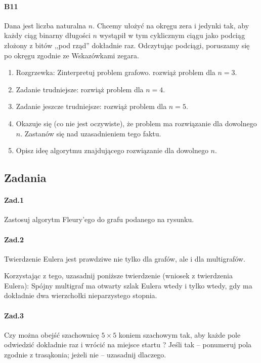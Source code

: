 \documentclass[a4paper,12pt]{article}
\theoremstyle{definition}%
\theoremstyle{definition}
\theoremstyle{problem}
\begin{document}
\paragraph{B11} Dana jest liczba naturalna $n$. Chcemy ułożyć na okręgu zera i jedynki tak, aby każdy ciąg binarny
długości $n$ wystąpił w tym cyklicznym ciągu jako podciąg złożony z bitów ,,pod rząd” dokładnie raz. Odczytując podciągi, poruszamy się po okręgu zgodnie ze Wskazówkami zegara.
\begin{enumerate}[label=\alph*)]
\item Rozgrzewka: Zinterpretuj problem grafowo. rozwiąż problem dla $n = 3$.
\item Zadanie trudniejsze: rozwiąż problem dla $n = 4$.
\item Zadanie jeszcze trudniejsze: rozwiąż problem dla $n = 5$.
\item Okazuje się (co nie jest oczywiste), że problem ma rozwiązanie dla dowolnego $n$. Zastanów się nad uzasadnieniem tego faktu.
\item Opisz ideę algorytmu znajdującego rozwiązanie dla dowolnego $n$.
\end{enumerate}

\subsection{Zadania}
\paragraph{Zad.1} Zastosuj algorytm Fleury’ego do grafu podanego na rysunku.

\paragraph{Zad.2} Twierdzenie Eulera jest prawdziwe nie tylko dla grafów, ale i dla multigrafów.

Korzystając z tego, uzasadnij poniższe twierdzenie (wniosek z twierdzenia Eulera):
Spójny multigraf ma otwarty szlak Eulera wtedy i tylko wtedy, gdy ma dokładnie dwa wierzchołki nieparzystego stopnia.

\paragraph{Zad.3} Czy można obejść szachownicę $5\times 5$ koniem szachowym tak, aby każde pole odwiedzić dokładnie raz i wrócić na miejsce startu ? Jeśli tak – ponumeruj pola zgodnie z trasąkonia; jeżeli nie – uzasadnij dlaczego.
\end{document}
